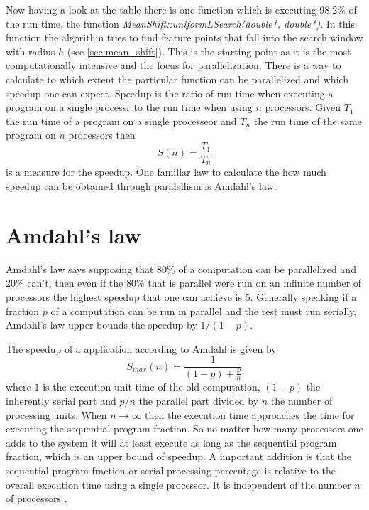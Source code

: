 Now having a look at the table there is one function which is executing 98.2\%
of the run time, the function \emph{MeanShift::uniformLSearch(double*,
double*)}. In this function the algorithm tries to find feature points that fall
into the search window with radius $h$ (see \autoref{sec:mean_shift}). This is
the starting point as it is the most computationally intensive and the focus for
parallelization. There is a way to calculate to which extent the particular
function can be parallelized and which speedup one can expect. Speedup is the 
ratio of run time when executing a program on a single processr to the run time
when using $n$ processors. Given $T_1$ the run time of a program on a single
processeor and $T_n$ the run time of the same program on $n$ processors then
\begin{equation}\label{eq:speedup}
	S(n) = \frac{T_1}{T_n}
\end{equation}
is a measure for the speedup. One familiar law to calculate the how much speedup
can be obtained through paralellism is Amdahl's law. 

\section{Amdahl's law} 
\label{sec:amdahl_s_law}
Amdahl's law says supposing that 80\% of a computation can be parallelized and
20\% can't, then even if the 80\% that is parallel were run on an infinite
number of processors the highest speedup that one can achieve is 5. Generally
speaking if a fraction $p$ of a computation can be run in parallel and the rest
must run serially, Amdahl's law upper bounds the speedup by $1/(1-p)$.

The speedup of a application according to Amdahl is given by
\begin{equation}\label{eq:amdahl} 
	S_{max}(n) = \frac{1}{(1-p) + \frac{p}{n}}
\end{equation} 
where $1$ is the execution unit time of the old computation, $(1-p)$ the
inherently serial part and $p/n$ the parallel part divided by $n$ the
number of processing units. When $n \rightarrow \infty$ then the execution time
approaches the time for executing the sequential program fraction. So no matter
how many processors one adds to the system it will at least execute as long as
the sequential program fraction, which is an upper bound of speedup. A important
addition is that the sequential program fraction or serial processing percentage
is relative to the overall execution time using a single processor. It is 
independent of the number $n$ of processors \citeauthor{citeulike:3838998} 
\citep{citeulike:3838998}. 


